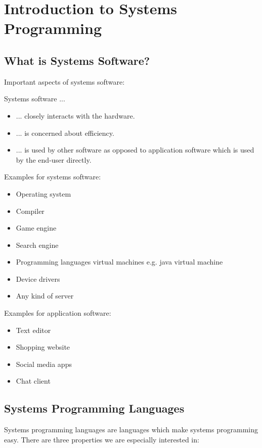 \section{Introduction to Systems Programming}

\subsection{What is Systems Software?}

Important aspects of systems software:

Systems software ...

\begin{itemize}
    \item ... closely interacts with the hardware.
    \item ... is concerned about efficiency.
    \item ... is used by other software as opposed to application software which is used by the end-user directly.
\end{itemize}

Examples for systems software:

\begin{itemize}
    \item Operating system
    \item Compiler
    \item Game engine
    \item Search engine
    \item Programming languages virtual machines e.g. java virtual machine
    \item Device drivers
    \item Any kind of server
\end{itemize}

Examples for application software:

\begin{itemize}
    \item Text editor
    \item Shopping website
    \item Social media apps
    \item Chat client
\end{itemize}

\subsection{Systems Programming Languages}

Systems programming languages are languages which make systems programming easy. There are three properties we are especially interested in:


